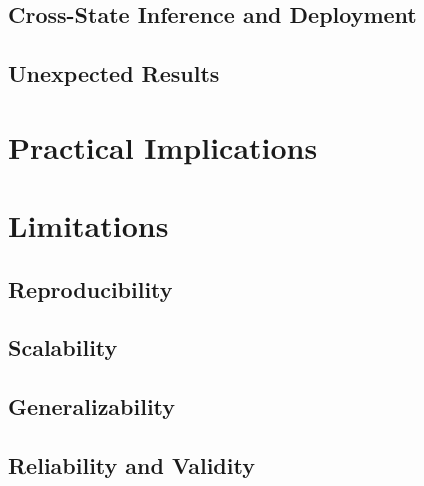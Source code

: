 \subsection{Cross-State Inference and Deployment}
\label{sec:discussion:interpretation:generalization}

\subsection{Unexpected Results}
\label{sec:discussion:interpretation:unexpected}

\section{Practical Implications}
\label{sec:discussion:implications}

\section{Limitations}
\label{sec:discussion:limitations}

\subsection{Reproducibility}
\label{sec:discussion:limitations:reproducibility}

\subsection{Scalability}
\label{sec:discussion:limitations:scalability}

\subsection{Generalizability}
\label{sec:discussion:limitations:generalizability}

\subsection{Reliability and Validity}
\label{sec:discussion:limitations:validity}
